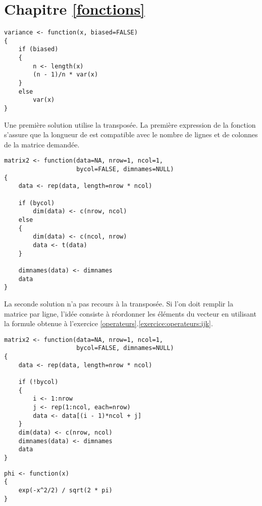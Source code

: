 \section*{Chapitre \ref{fonctions}}
\begin{reponse}{5.1}
\begin{verbatim}
variance <- function(x, biased=FALSE)
{
    if (biased)
    {
        n <- length(x)
        (n - 1)/n * var(x)
    }
    else
        var(x)
}
\end{verbatim}
  
\end{reponse}
\begin{reponse}{5.2}
    Une premi^^e8re solution utilise la transpos^^e9e. La premi^^e8re
    expression de la fonction s'assure que la longueur de
     est compatible avec le nombre de lignes et de
    colonnes de la matrice demand^^e9e.
\begin{verbatim}
matrix2 <- function(data=NA, nrow=1, ncol=1,
                    bycol=FALSE, dimnames=NULL)
{
    data <- rep(data, length=nrow * ncol)

    if (bycol)
        dim(data) <- c(nrow, ncol)
    else
    {
        dim(data) <- c(ncol, nrow)
        data <- t(data)
    }

    dimnames(data) <- dimnames
    data
}
\end{verbatim}
    La seconde solution n'a pas recours ^^e0 la transpos^^e9e. Si l'on doit
    remplir la matrice par ligne, l'id^^e9e consiste ^^e0 r^^e9ordonner les
    ^^e9l^^e9ments du vecteur  en utilisant la formule obtenue
    ^^e0 l'exercice \ref{operateurs}.\ref{exercice:operateurs:ijk}.
\begin{verbatim}
matrix2 <- function(data=NA, nrow=1, ncol=1,
                    bycol=FALSE, dimnames=NULL)
{
    data <- rep(data, length=nrow * ncol)

    if (!bycol)
    {
        i <- 1:nrow
        j <- rep(1:ncol, each=nrow)
        data <- data[(i - 1)*ncol + j]
    }
    dim(data) <- c(nrow, ncol)
    dimnames(data) <- dimnames
    data
}
\end{verbatim}
  
\end{reponse}
\begin{reponse}{5.3}
\begin{verbatim}
phi <- function(x)
{
    exp(-x^2/2) / sqrt(2 * pi)
}
\end{verbatim}
  
\end{reponse}
